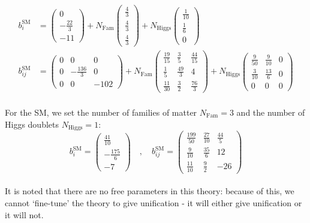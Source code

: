 \documentclass[12pt,a4paper,oneside]{article}
\begin{document}
\begin{align}
b^\mathrm{SM}_i &= 
\begin{pmatrix} 0 \\ -\frac{22}{3} \\ -11 \end{pmatrix} 
+ N_\mathrm{Fam} \begin{pmatrix} \frac{4}{3} \\ \frac{4}{3} \\ \frac{4}{3} \end{pmatrix} 
+ N_\mathrm{Higgs} \begin{pmatrix} \frac{1}{10} \\ \frac{1}{6} \\ 0 \end{pmatrix} \nonumber \\
b^\mathrm{SM}_{ij} &= 
\begin{pmatrix} 
0 & 0 & 0 \\ 
0 & -\frac{136}{3} & 0 \\ 
0 & 0 & -102 
\end{pmatrix}
+ N_\mathrm{Fam} 
\begin{pmatrix} 
\frac{19}{15} & \frac{3}{5} & \frac{44}{15} \\ 
\frac{1}{5} & \frac{49}{3} & 4 \\ 
\frac{11}{30} & \frac{3}{2} & \frac{76}{3}
\end{pmatrix}
+ N_\mathrm{Higgs}
\begin{pmatrix}
\frac{9}{50} & \frac{9}{10} & 0 \\
\frac{3}{10} & \frac{13}{6} & 0 \\
0 & 0 & 0
\end{pmatrix} 
\nonumber
\end{align}
\\
\doublespace
For the SM, we set the number of families of matter $N_\mathrm{Fam} = 3$ and the number of Higgs doublets $N_\mathrm{Higgs} = 1$:
\singlespace
\begin{equation}
b^\mathrm{SM}_i = 
\begin{pmatrix} \frac{41}{10} \\ -\frac{175}{6} \\ -7 \end{pmatrix}
\quad,\quad
b^\mathrm{SM}_{ij} = 
\begin{pmatrix} 
\frac{199}{50} & \frac{27}{10} & \frac{44}{5} \\ 
\frac{9}{10} & \frac{35}{6} & 12 \\ 
\frac{11}{10} & \frac{9}{2} & -26
\end{pmatrix}
\label{eqn:sm-bi-bij}
\end{equation}
\\
\doublespace
It is noted that there are no free parameters in this theory: because of this, we cannot `fine-tune' the theory to give unification - it will either give unification or it will not.
\end{document}
